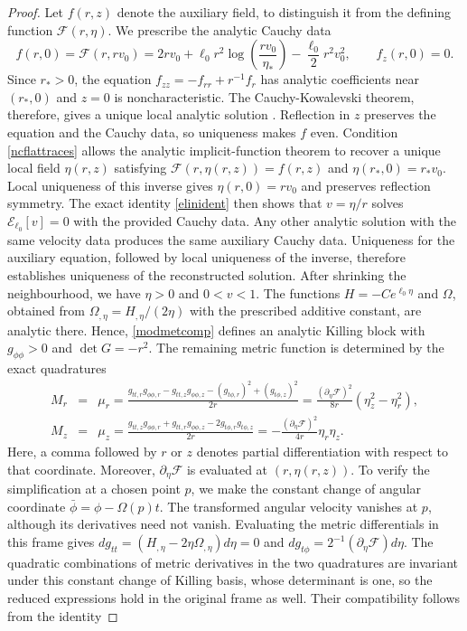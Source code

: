 \documentclass[amsmath,amsfonts,amssymb,aps,pra,superscriptaddress,10pt]{revtex4-2}
\numberwithin{equation}{section}
\theoremstyle{plain}
\theoremstyle{definition}
\theoremstyle{remark}
\theoremstyle{definition}
\newcommand{\ellzero}{\ell_0}
\newcommand{\EE}{\mathcal E_{\ellzero}}
\begin{document}
\begin{proof}
Let $f(r,z)$ denote the auxiliary field, to distinguish it from the defining function $\mathcal{F}(r,\eta)$. We prescribe the analytic Cauchy data
\begin{equation}
f(r,0)=\mathcal{F}(r,rv_0)=2r v_0+\ellzero r^2\log{\left(\frac{rv_0}{\eta_*}\right)}-\frac{\ellzero}{2}r^2v_0^2,\qquad 
f_z(r,0)=0.
\end{equation}
Since $r_*>0$, the equation $f_{zz}=-f_{rr}+r^{-1}f_r$ has analytic coefficients near $(r_*,0)$ and $z=0$ is noncharacteristic. The Cauchy-Kowalevski theorem, therefore, gives a unique local analytic solution \cite{Evans2010PDE}. Reflection in $z$ preserves the equation and the Cauchy data, so uniqueness makes $f$ even. Condition \eqref{ncflattraces} allows the analytic implicit-function theorem to recover a unique local field $\eta(r,z)$ satisfying $\mathcal{F}(r,\eta(r,z))=f(r,z)$ and $\eta(r_*,0)=r_*v_0$. Local uniqueness of this inverse gives $\eta(r,0)=rv_0$ and preserves reflection symmetry. The exact identity \eqref{elinident} then shows that $v=\eta/r$ solves $\EE[v]=0$ with the provided Cauchy data. Any other analytic solution with the same velocity data produces the same auxiliary Cauchy data. Uniqueness for the auxiliary equation, followed by local uniqueness of the inverse, therefore establishes uniqueness of the reconstructed solution. After shrinking the neighbourhood, we have $\eta>0$ and $0<v<1$. The functions $H=-Ce^{\ellzero\eta}$ and $\Omega$, obtained from $\Omega_{,\eta}=H_{,\eta}/(2\eta)$ with the prescribed additive constant, are analytic there. Hence, \eqref{modmetcomp} defines an analytic Killing block with $g_{\phi\phi}>0$ and $\det G=-r^2$. The remaining metric function is determined by the exact quadratures \cite{Winicour1975JMP,Astesiano2022EPJC}
\begin{eqnarray}
M_r&=&\mu_r=\frac{g_{tt,r} g_{\phi\phi,r}-g_{tt,z}g_{\phi\phi,z}
-(g_{t\phi,r})^2+(g_{t\phi,z})^2}{2r}=\frac{(\partial_\eta\mathcal{F})^2}{8r}(\eta_z^2-\eta_r^2),\label{locmuquad}\\
M_z&=&\mu_z=\frac{g_{tt,z} g_{\phi\phi,r}+g_{tt,r} g_{\phi\phi,z}-2g_{t\phi,r}g_{t\phi,z}}{2r}=-\frac{(\partial_\eta\mathcal{F})^2}{4r}\eta_r\eta_z.\label{locmuquadz}
\end{eqnarray}
Here, a comma followed by $r$ or $z$ denotes partial differentiation with respect to that coordinate. Moreover, $\partial_\eta\mathcal{F}$ is evaluated at $(r,\eta(r,z))$. To verify the simplification at a chosen point $p$, we make the constant change of angular coordinate $\bar{\phi}=\phi-\Omega(p)t$. The transformed angular velocity vanishes at $p$, although its derivatives need not vanish. Evaluating the metric differentials in this frame gives $dg_{tt}=(H_{,\eta}-2\eta\Omega_{,\eta})d\eta=0$ and $dg_{t\phi}=2^{-1}(\partial_\eta\mathcal{F})d\eta$. The quadratic combinations of metric derivatives in the two quadratures are invariant under this constant change of Killing basis, whose determinant is one, so the reduced expressions hold in the original frame as well. Their compatibility follows from the identity

\end{proof}
\end{document}
